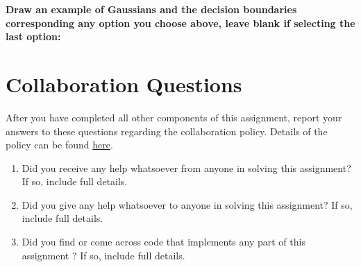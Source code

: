 \documentclass[11pt,addpoints,answers]{exam}
\begin{document}
\begin{questions}
     
    \textbf{Draw an example of Gaussians and the decision boundaries corresponding any option you choose above, leave blank if selecting the last option: }
    
    
    
    \begin{your_solution}[title=Your answer,height=7cm,width=15cm]
    \end{your_solution}

    
    
    
\end{questions}

\clearpage\newpage
\section{Collaboration Questions}
After you have completed all other components of this assignment, report your answers to these questions regarding the collaboration policy. Details of the policy can be found \href{http://www.cs.cmu.edu/~mgormley/courses/10601/syllabus.html}{here}.
\begin{enumerate}
    \item Did you receive any help whatsoever from anyone in solving this assignment? If so, include full details.
    \item Did you give any help whatsoever to anyone in solving this assignment? If so, include full details.
    \item Did you find or come across code that implements any part of this assignment ? If so, include full details.
\end{enumerate}

\begin{your_solution}[height=6cm]

\end{your_solution}
\end{document}

